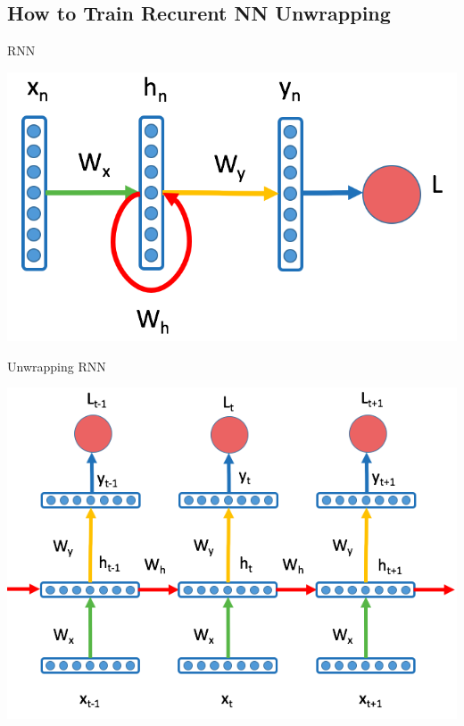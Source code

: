 \documentclass{beamer}
\begin{document}
	\subsection*{How to Train Recurent NN Unwrapping}
	\begin{frame}
		
		RNN

				\begin{center}
					\includegraphics[scale=0.2]{img/rnn}
				\end{center}
				
		Unwrapping RNN

				\begin{center}
					\includegraphics[scale=0.22]{img/rnnw}
				\end{center}		
	\end{frame}
	
\end{document}
